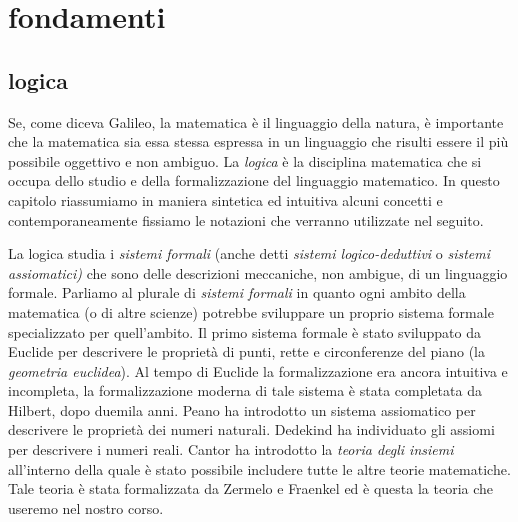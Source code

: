 \chapter{fondamenti}
\section{logica}

Se, come diceva Galileo, la matematica è il linguaggio della natura,
è importante che la matematica sia essa stessa espressa in un linguaggio
che risulti essere il più possibile oggettivo e non ambiguo.
La \emph{logica} è la disciplina matematica che si occupa
dello studio e della formalizzazione del linguaggio matematico.
In questo capitolo riassumiamo in maniera sintetica ed intuitiva
alcuni concetti e contemporaneamente
fissiamo le notazioni che verranno utilizzate nel seguito.

La logica studia i \emph{sistemi formali}%
%
 (anche detti \emph{sistemi logico-deduttivi}
o \emph{sistemi assiomatici)} che sono delle descrizioni meccaniche, non ambigue, 
di un linguaggio formale. 
Parliamo al plurale di \emph{sistemi formali} in quanto ogni ambito della matematica 
(o di altre scienze) potrebbe sviluppare un proprio sistema formale specializzato per quell'ambito. 
Il primo sistema formale è stato sviluppato da Euclide per descrivere le proprietà 
di punti, rette e circonferenze del piano (la \emph{geometria euclidea}).
Al tempo di Euclide la formalizzazione era ancora intuitiva e incompleta, 
la formalizzazione moderna 
di tale sistema è stata completata da Hilbert, dopo duemila anni.
Peano ha introdotto un sistema assiomatico per descrivere le proprietà dei numeri naturali.
Dedekind ha individuato gli assiomi per descrivere i numeri reali.
Cantor ha introdotto la \emph{teoria degli insiemi} all'interno della quale è stato 
possibile includere tutte le altre teorie matematiche. 
Tale teoria è stata formalizzata da Zermelo e Fraenkel
ed è questa la teoria che useremo nel nostro corso.


